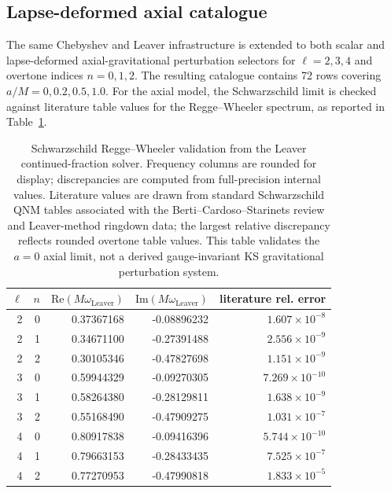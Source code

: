 ﻿\documentclass[12pt,a4paper]{article}
\begin{document}
\subsection{Lapse-deformed axial catalogue}

The same Chebyshev and Leaver infrastructure is extended to both scalar and lapse-deformed axial-gravitational perturbation selectors for \(\ell=2,3,4\) and overtone indices \(n=0,1,2\). The resulting catalogue contains 72 rows covering \(a/M=0,0.2,0.5,1.0\). For the axial model, the Schwarzschild limit is checked against literature table values for the Regge--Wheeler spectrum, as reported in Table~\ref{tab:gravitationalcatalogue}.

\begin{table}[H]
\centering
\footnotesize
\renewcommand{\arraystretch}{1.14}
\begin{tabular}{rrrrr}
\toprule
\(\ell\) & \(n\) &
\(\mathrm{Re}(M\omega_{\mathrm{Leaver}})\) &
\(\mathrm{Im}(M\omega_{\mathrm{Leaver}})\) &
literature rel. error\\
\midrule
2 & 0 & 0.37367168 & -0.08896232 & \(1.607\times10^{-8}\)\\
2 & 1 & 0.34671100 & -0.27391488 & \(2.556\times10^{-9}\)\\
2 & 2 & 0.30105346 & -0.47827698 & \(1.151\times10^{-9}\)\\
3 & 0 & 0.59944329 & -0.09270305 & \(7.269\times10^{-10}\)\\
3 & 1 & 0.58264380 & -0.28129811 & \(1.638\times10^{-9}\)\\
3 & 2 & 0.55168490 & -0.47909275 & \(1.031\times10^{-7}\)\\
4 & 0 & 0.80917838 & -0.09416396 & \(5.744\times10^{-10}\)\\
4 & 1 & 0.79663153 & -0.28433435 & \(7.525\times10^{-7}\)\\
4 & 2 & 0.77270953 & -0.47990818 & \(1.833\times10^{-5}\)\\
\bottomrule
\end{tabular}
\caption{Schwarzschild Regge--Wheeler validation from the Leaver continued-fraction solver. Frequency columns are rounded for display; discrepancies are computed from full-precision internal values. Literature values are drawn from standard Schwarzschild QNM tables associated with the Berti--Cardoso--Starinets review and Leaver-method ringdown data; the largest relative discrepancy reflects rounded overtone table values. This table validates the \(a=0\) axial limit, not a derived gauge-invariant KS gravitational perturbation system.}
\label{tab:gravitationalcatalogue}
\end{table}
\end{document}

